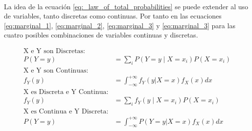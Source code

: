 \documentclass{article}
\begin{document}
    \paragraph{}
    La idea de la ecuación \eqref{eq:_law_of_total_probabilities} se puede extender al uso de variables, tanto discretas como continuas. Por tanto en las ecuaciones \eqref{eq:marginal_1}, \eqref{eq:marginal_2}, \eqref{eq:marginal_3} y \eqref{eq:marginal_3} para las cuatro posibles combinaciones de variables continuas y discretas.

    \begin{align}
      \text{X e Y son Discretas:}&\\
    \label{eq:marginal_1}
      P(Y=y) &= \sum_iP(Y = y \mid X = x_i)P(X = x_i)\\
      \text{X e Y son Continuas:}&\\
    \label{eq:marginal_2}
      f_{Y}(y) &=\int_{-\infty}^{+\infty}f_{Y}(y | X = x)f_X(x) dx \\
      \text{X es Discreta e Y Continua:}&\\
    \label{eq:marginal_3}
      f_{Y}(y) &= \sum_if_{Y}(y \mid X = x_i)P(X = x_i)\\
      \text{X es Continua e Y Discreta:}&\\
    \label{eq:marginal_4}
      P(Y = y) &=\int_{-\infty}^{+\infty}P( Y =y | X = x)f_X(x) dx \\
    \end{align}
	\nocite{prob2017}

  
  
\end{document}

